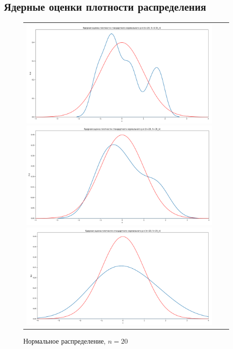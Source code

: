 \subsection{Ядерные оценки плотности распределения}

\begin{figure}[H]
	\begin{tabular}{ccc}
		\includegraphics[scale=0.14]{resources/4_gauss_20_half.png}
		\includegraphics[scale=0.14]{resources/4_gauss_20_one.png}
		\includegraphics[scale=0.14]{resources/4_gauss_20_two.png}
	\end{tabular}
	\caption{Нормальное распределение, $n=20$}
\end{figure}

